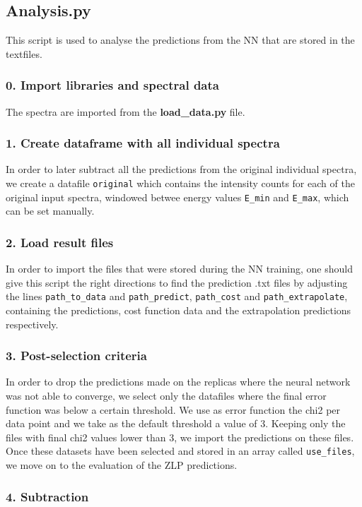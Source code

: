 \subsection{Analysis.py}
This script is used to analyse the predictions from the NN that are stored in the textfiles. 
%
\subsubsection*{0. Import libraries and spectral data}
The spectra are imported from the {\bf load\_data.py} file.

\subsubsection*{1. Create dataframe with all individual spectra}
In order to later subtract all the predictions from the original individual spectra, we create a datafile
{\tt original} which contains the intensity counts for each of the original input spectra, windowed 
betwee energy values {\tt E\_min} and {\tt E\_max}, which can be set manually.

\subsubsection*{2. Load result files}
In order to import the files that were stored during the NN training, 
one should give this script the right directions to find the prediction .txt files
by adjusting the lines {\tt path\_to\_data} and {\tt path\_predict}, {\tt path\_cost} and {\tt path\_extrapolate}, 
containing the predictions, cost function data and the extrapolation predictions respectively.
%

\subsubsection*{3. Post-selection criteria}
In order to drop the predictions made on the replicas where the neural network was not able to converge,
we select only the datafiles where the final error function was below a certain threshold. 
%
We use as error function the chi2 per data point and we take as the default threshold a value of 3. 
%
Keeping only the files with final chi2 values lower than 3, we import the predictions on these files.
%
Once these datasets have been selected and stored in an array called {\tt use\_files},
we move on to the evaluation of the ZLP predictions. 
%
\subsubsection*{4. Subtraction}

